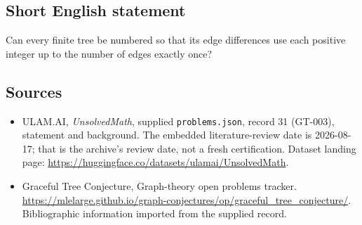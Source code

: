 \documentclass[11pt,a4paper]{article}
\begin{document}
\subsection{Short English statement}

Can every finite tree be numbered so that its edge differences use each positive integer up to the number of edges exactly once?

\subsection{Sources}

{\small

\begin{itemize}

\item[\hypertarget{source:31:1}{S1}] ULAM.AI, \emph{UnsolvedMath}, supplied \texttt{problems.json}, record 31 (GT-003), statement and background. The embedded literature-review date is 2026-08-17; that is the archive’s review date, not a fresh certification. Dataset landing page: \url{https://huggingface.co/datasets/ulamai/UnsolvedMath}.

\item[\hypertarget{source:31:2}{S2}] Graceful Tree Conjecture, Graph-theory open problems tracker. \url{https://mlelarge.github.io/graph-conjectures/op/graceful_tree_conjecture/}. Bibliographic information imported from the supplied record.

\end{itemize}

}

\label{end:31}
\end{document}
